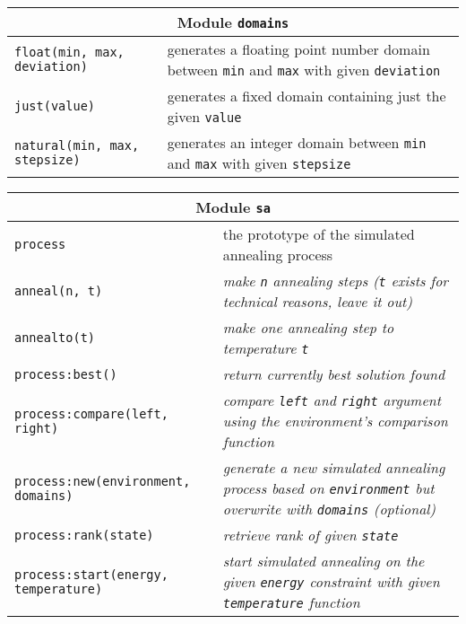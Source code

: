 \begin{appendices}
\begin{table}[H]
\begin{tabular}{|p{5cm}|p{8cm}|}
\hline
\multicolumn{2}{|c|}{Module \texttt{domains}}\\
\hline
\hline
\texttt{float(min, max, deviation)} & generates a floating point number domain between \texttt{min} and \texttt{max} with given \texttt{deviation} \\
\hline
\texttt{just(value)} & generates a fixed domain containing just the given \texttt{value} \\
\hline
\texttt{natural(min, max, stepsize)} & generates an integer domain between \texttt{min} and \texttt{max} with given \texttt{stepsize} \\
\hline
\end{tabular}
\end{table}

\begin{table}[H]
\begin{tabular}{|p{5cm}|p{8cm}|}
\hline
\multicolumn{2}{|c|}{Module \texttt{sa}}\\
\hline
\hline
\texttt{process} & the prototype of the simulated annealing process \\
\hline
\texttt{anneal(n, t)} & \emph{make \texttt{n} annealing steps (\texttt{t} exists for technical reasons, leave it out)}\\
\hline
\texttt{annealto(t)} & \emph{make one annealing step to temperature \texttt{t}}\\
\hline
\texttt{process:best()} & \emph{return currently best solution found}\\
\hline
\texttt{process:compare(left, right)} & \emph{compare \texttt{left} and \texttt{right} argument using the environment's comparison function}\\
\hline
\texttt{process:new(environment, domains)} & \emph{generate a new simulated annealing process based on \texttt{environment} but overwrite with \texttt{domains} (optional)}\\
\hline
\texttt{process:rank(state)} & \emph{retrieve rank of given \texttt{state}}\\
\hline
\texttt{process:start(energy, temperature)} & \emph{start simulated annealing on the given \texttt{energy} constraint with given \texttt{temperature} function}\\
\hline
\end{tabular}
\end{table}


\end{appendices}
